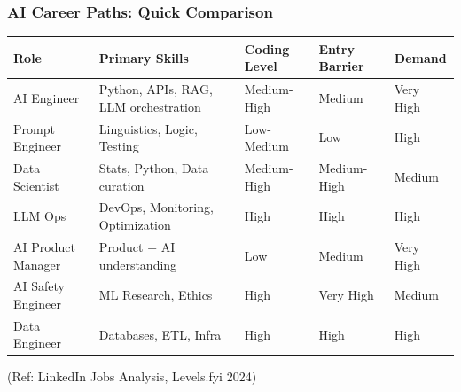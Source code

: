\begin{frame}[fragile]\frametitle{AI Career Paths: Quick Comparison}
\begin{center}
\small
\begin{tabular}{|p{1.8cm}|p{2.5cm}|p{1.8cm}|p{1.8cm}|p{1.5cm}|}
\hline
\textbf{Role} & \textbf{Primary Skills} & \textbf{Coding Level} & \textbf{Entry Barrier} & \textbf{Demand} \\
\hline
AI Engineer & Python, APIs, RAG, LLM orchestration & Medium-High & Medium & Very High \\
\hline
Prompt Engineer & Linguistics, Logic, Testing & Low-Medium & Low & High \\
\hline
Data Scientist & Stats, Python, Data curation & Medium-High & Medium-High & Medium \\
\hline
LLM Ops & DevOps, Monitoring, Optimization & High & High & High \\
\hline
AI Product Manager & Product + AI understanding & Low & Medium & Very High \\
\hline
AI Safety Engineer & ML Research, Ethics & High & Very High & Medium \\
\hline
Data Engineer & Databases, ETL, Infra & High & High & High \\
\hline
\end{tabular}
\end{center}


{\tiny (Ref: LinkedIn Jobs Analysis, Levels.fyi 2024)}
\end{frame}


